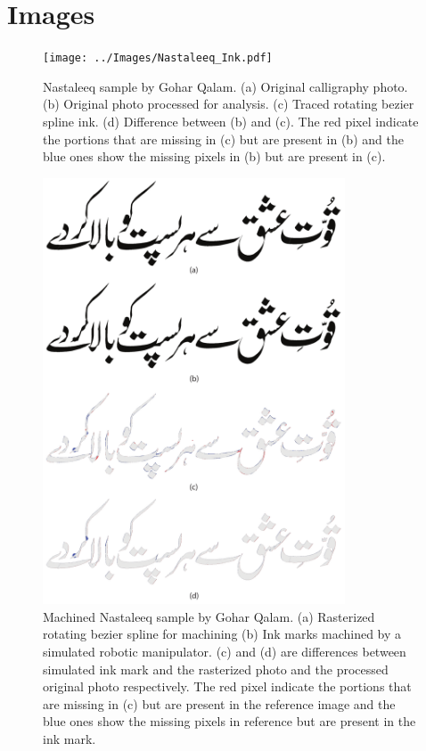 \section{Images}
{

\begin{figure}[H]
  \centering
  \texttt{[image: ../Images/Nastaleeq\_Ink.pdf]}
  \caption
  {
      Nastaleeq sample by Gohar Qalam. (a) Original calligraphy photo. (b) Original photo processed for analysis. (c) Traced rotating bezier spline ink. (d) Difference between (b) and (c). The red pixel indicate the portions that are missing in (c) but are present in (b) and the blue ones show the missing pixels in (b) but are present in (c).
  }
\end{figure}

\begin{figure}[H]
  \centering
  \includegraphics[width=0.8\textwidth]{../Images/Nastaleeq_Machined.pdf}
  \caption
  {
      Machined Nastaleeq sample by Gohar Qalam. (a) Rasterized rotating bezier spline for machining (b) Ink marks machined by a simulated robotic manipulator. (c) and (d) are differences between simulated ink mark and the rasterized photo and the processed original photo respectively. The red pixel indicate the portions that are missing in (c) but are present in the reference image and the blue ones show the missing pixels in reference but are present in the ink mark.
  }
\end{figure}

}
